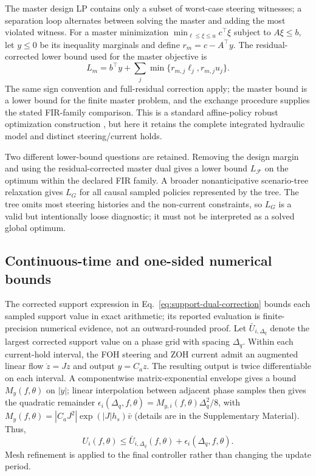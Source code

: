 \documentclass[fleqn,final,5p,times]{elsarticle}
\begin{document}
The master design LP contains only a subset of worst-case steering witnesses; a separation loop alternates between solving the master and adding the most violated witness. For a master minimization $\min_{\ell\le\xi\le u}c^\top\xi$ subject to $A\xi\le b$, let $y\le0$ be its inequality marginals and define $r_m=c-A^\top y$. The residual-corrected lower bound used for the master objective is
\begin{equation}
L_m=b^\top y+\sum_j\min\{r_{m,j}\ell_j,r_{m,j}u_j\}.
\label{eq:master-dual-correction}
\end{equation}
The same sign convention and full-residual correction apply; the master bound is a lower bound for the finite master problem, and the exchange procedure supplies the stated FIR-family comparison. This is a standard affine-policy robust optimization construction \cite{goulart2006,boyd2004}, but here it retains the complete integrated hydraulic model and distinct steering/current holds.

Two different lower-bound questions are retained. Removing the design margin and using the residual-corrected master dual gives a lower bound $L_{\mathcal F}$ on the optimum within the declared FIR family. A broader nonanticipative scenario-tree relaxation gives $L_G$ for all causal sampled policies represented by the tree. The tree omits most steering histories and the non-current constraints, so $L_G$ is a valid but intentionally loose diagnostic; it must not be interpreted as a solved global optimum.

\subsection{Continuous-time and one-sided numerical bounds}

The corrected support expression in Eq.~\eqref{eq:support-dual-correction} bounds each sampled support value in exact arithmetic; its reported evaluation is finite-precision numerical evidence, not an outward-rounded proof. Let $\bar U_{i,\Delta_q}$ denote the largest corrected support value on a phase grid with spacing $\Delta_q$. Within each current-hold interval, the FOH steering and ZOH current admit an augmented linear flow $\dot z=Jz$ and output $y=C_a z$. The resulting output is twice differentiable on each interval. A componentwise matrix-exponential envelope gives a bound $M_y(f,\theta)$ on $|\ddot y|$; linear interpolation between adjacent phase samples then gives the quadratic remainder $\epsilon_i(\Delta_q,f,\theta)=M_{y,i}(f,\theta)\Delta_q^2/8$, with $M_y(f,\theta)=|C_aJ^2|\exp(|J|h_s)\bar v$ (details are in the Supplementary Material). Thus,
\begin{equation}
U_i(f,\theta)\le \bar U_{i,\Delta_q}(f,\theta)+\epsilon_i(\Delta_q,f,\theta).
\label{eq:continuous-bound}
\end{equation}
Mesh refinement is applied to the final controller rather than changing the update period.
\end{document}
